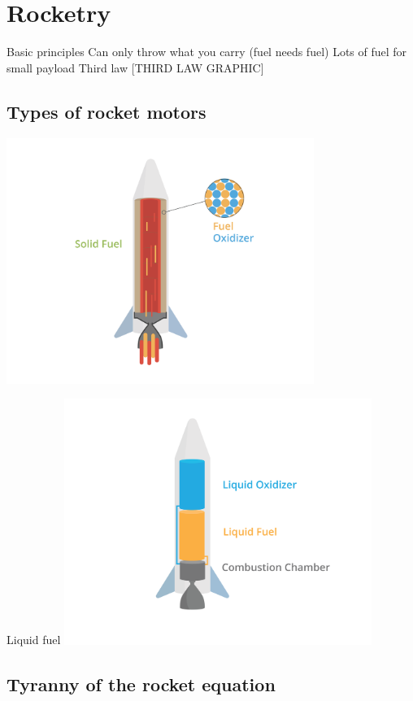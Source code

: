 \chapter{Rocketry}


Basic principles
	Can only throw what you carry (fuel needs fuel)
	Lots of fuel for small payload
	Third law
	[THIRD LAW GRAPHIC]



\section{Types of rocket motors}

	\includegraphics[width=0.75\textwidth]{solid.png}

Liquid fuel
	\includegraphics[width=0.75\textwidth]{liquid.png}



\section{Tyranny of the rocket equation}
	

